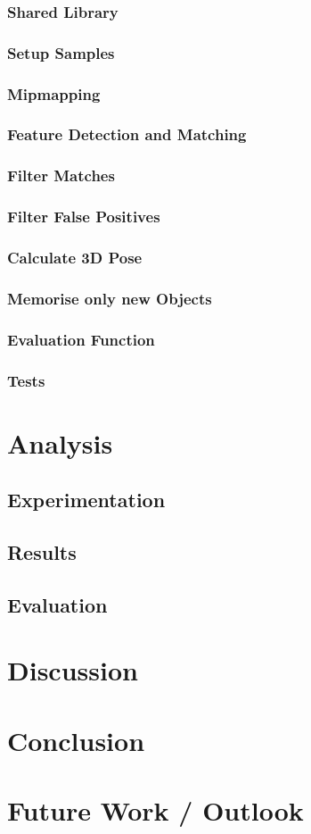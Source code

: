 \documentclass[11pt, twoside, a4paper]{report}
\begin{document}
\subsection{Shared Library}
\subsection{Setup Samples}
\subsection{Mipmapping}
\subsection{Feature Detection and Matching}
\subsection{Filter Matches}
\subsection{Filter False Positives}
\subsection{Calculate 3D Pose}
\subsection{Memorise only new Objects}
\subsection{Evaluation Function}
\subsection{Tests}


\chapter{Analysis}
\section{Experimentation}
\section{Results}
\section{Evaluation}


\chapter{Discussion}


\chapter{Conclusion}


\chapter{Future Work / Outlook}
\end{document}

